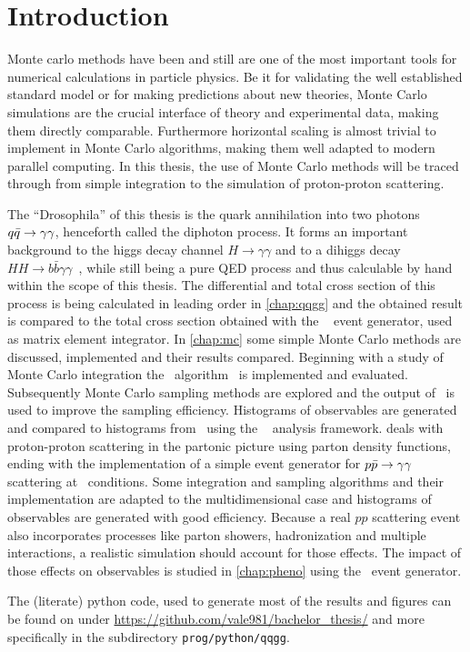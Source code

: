 \chapter{Introduction}%
\label{chap:intro}

Monte carlo methods have been and still are one of the most important
tools for numerical calculations in particle physics. Be it for
validating the well established standard model or for making
predictions about new theories, Monte Carlo simulations are the
crucial interface of theory and experimental data, making them
directly comparable. Furthermore horizontal scaling is almost trivial
to implement in Monte Carlo algorithms, making them well adapted to
modern parallel computing. In this thesis, the use of Monte Carlo
methods will be traced through from simple integration to the
simulation of proton-proton scattering.

The ``Drosophila'' of this thesis is the quark annihilation into two
photons \(q\bar{q}\rightarrow\gamma\gamma\), henceforth called the diphoton process. It forms an
important background to the higgs decay channel
\(H\rightarrow \gamma\gamma\) and to a dihiggs decay
\(HH\rightarrow b\bar{b}\gamma\gamma\)~\cite{aaboud2018:sf}, while
still being a pure QED process and thus calculable by hand within the
scope of this thesis. The differential and total cross section of this
process is being calculated in leading order in \cref{chap:qqgg} and
the obtained result is compared to the total cross section obtained
with the \sherpa~\cite{Gleisberg:2008ta} event generator, used as
matrix element integrator. In \cref{chap:mc} some simple Monte Carlo
methods are discussed, implemented and their results
compared. Beginning with a study of Monte Carlo integration the
\vegas\ algorithm~\cite{Lepage:19781an} is implemented and
evaluated. Subsequently Monte Carlo sampling methods are explored and
the output of \vegas\ is used to improve the sampling
efficiency. Histograms of observables are generated and compared to
histograms from \sherpa\ using the \rivet~\cite{Bierlich:2019rhm}
analysis framework.  deals with proton-proton
scattering in the partonic picture using parton density functions,
ending with the implementation of a simple event generator for
\(p\bar{p}\rightarrow\gamma\gamma\) scattering at \lhc\ conditions. Some integration and
sampling algorithms and their implementation are adapted to the
multidimensional case and histograms of observables are generated with
good efficiency.  Because a real \(pp\) scattering event also
incorporates processes like parton showers, hadronization and multiple
interactions, a realistic simulation should account for those
effects. The impact of those effects on observables is studied in
\cref{chap:pheno} using the \sherpa\ event generator.

The (literate) python code, used to generate most of the results and
figures can be found on under
\url{https://github.com/vale981/bachelor_thesis/} and more
specifically in the subdirectory \texttt{prog/python/qqgg}.

